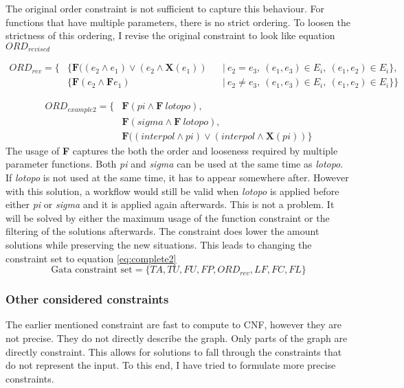 \documentclass{article}
\begin{document}
The original order constraint is not sufficient to capture this behaviour. For functions that have multiple parameters, there is no strict ordering. To loosen the strictness of this ordering, I revise the original constraint to look like equation $ORD_{revised}$

\begin{align*}
        ORD_{rev} =\{& \{\textbf{F}((e_2 \wedge e_1) \vee (e_2 \wedge \textbf{X} (e_1)  )&  &|\ e_2 = e_3,\ (e_1,e_3) \in  E_i ,\ (e_1,e_2) \in  E_i \}, \\
        &\{\textbf{F}(e_2 \wedge \textbf{F} e_1) &  &|\ e_2 \not= e_3,\ (e_1,e_3) \in  E_i ,\ (e_1,e_2) \in  E_i\}\}
\end{align*}

\begin{align*}
    ORD_{example2} = \{& \textbf{F}(pi \wedge \textbf{F}\ lotopo), \\
    & \textbf{F}(sigma \wedge \textbf{F}\ lotopo), \\
    &\textbf{F}((interpol \wedge pi) \vee (interpol \wedge \textbf{X} (pi)  ) 
    \}
\end{align*}
The usage of \textbf{F} captures the both the order and looseness required by multiple parameter functions. Both \textit{pi} and \textit{sigma} can be used at the same time as \textit{lotopo}. If \textit{lotopo} is not used at the same time, it has to appear somewhere after. However with this solution, a workflow would still be valid when \textit{lotopo} is applied before either \textit{pi} or \textit{sigma} and it is applied again afterwards. This is not a problem. It will be solved by either the maximum usage of the function constraint or the filtering of the solutions afterwards. The constraint does lower the amount solutions while preserving the new situations. This leads to changing the constraint set to equation \ref{eq:complete2}
\begin{equation}
 \text{Gata constraint set}= \{TA, TU, FU, FP, ORD_{rev}, LF, FC,FL\} \label{eq:complete2}
\end{equation}
 
 




\subsubsection{Other considered constraints}
The earlier mentioned constraint are fast to compute to CNF, however they are not precise. They do not directly describe the graph. Only parts of the graph are directly constraint. This allows for solutions to fall through the constraints that do not represent the input. To this end, I have tried to formulate more precise constraints. \\
\end{document}
